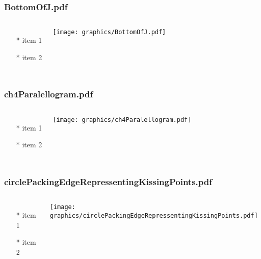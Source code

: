 \documentclass{beamer}
\begin{document}
\begin{frame} \frametitle{BottomOfJ.pdf}
    \begin{columns}[c]
        \begin{itemize}
            \item[*] item 1
            \item[*] item 2
        \end{itemize}
        \begin{minipage}{\linewidth}
            \begin{center}
            \texttt{[image: graphics/BottomOfJ.pdf]}
            \label{gfx:BottomOfJ.pdf}
            \end{center}
        \end{minipage}
    \end{columns}
\end{frame}
\begin{frame} \frametitle{ch4Paralellogram.pdf}
    \begin{columns}[c]
        \begin{itemize}
            \item[*] item 1
            \item[*] item 2
        \end{itemize}
        \begin{minipage}{\linewidth}
            \begin{center}
            \texttt{[image: graphics/ch4Paralellogram.pdf]}
            \label{gfx:ch4Paralellogram.pdf}
            \end{center}
        \end{minipage}
    \end{columns}
\end{frame}
\begin{frame} \frametitle{circlePackingEdgeRepressentingKissingPoints.pdf}
    \begin{columns}[c]
        \begin{itemize}
            \item[*] item 1
            \item[*] item 2
        \end{itemize}
        \begin{minipage}{\linewidth}
            \begin{center}
            \texttt{[image: graphics/circlePackingEdgeRepressentingKissingPoints.pdf]}
            \label{gfx:circlePackingEdgeRepressentingKissingPoints.pdf}
            \end{center}
        \end{minipage}
    \end{columns}
\end{frame}
\end{document}

